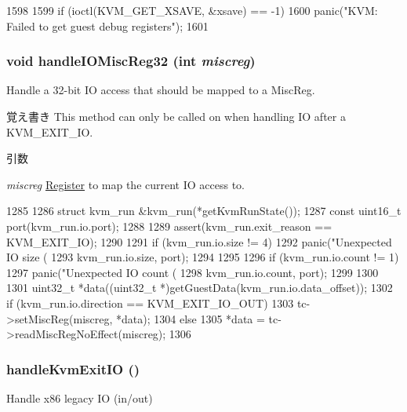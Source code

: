 \begin{DoxyCode}
1598 {
1599     if (ioctl(KVM_GET_XSAVE, &xsave) == -1)
1600         panic("KVM: Failed to get guest debug registers\n");
1601 }
\end{DoxyCode}
\hypertarget{classX86KvmCPU_a58452f4681b53990ff7470d1884ac13c}{
\subsubsection[{handleIOMiscReg32}]{\setlength{\rightskip}{0pt plus 5cm}void handleIOMiscReg32 (int {\em miscreg})}}
\label{classX86KvmCPU_a58452f4681b53990ff7470d1884ac13c}
Handle a 32-\/bit IO access that should be mapped to a MiscReg.

\begin{DoxyNote}{覚え書き}
This method can only be called on when handling IO after a KVM\_\-EXIT\_\-IO.
\end{DoxyNote}

\begin{DoxyParams}{引数}
\item[{\em miscreg}]\hyperlink{classRegister}{Register} to map the current IO access to. \end{DoxyParams}



\begin{DoxyCode}
1285 {
1286     struct kvm_run &kvm_run(*getKvmRunState());
1287     const uint16_t port(kvm_run.io.port);
1288 
1289     assert(kvm_run.exit_reason == KVM_EXIT_IO);
1290 
1291     if (kvm_run.io.size != 4) {
1292         panic("Unexpected IO size (%
1293               kvm_run.io.size, port);
1294     }
1295 
1296     if (kvm_run.io.count != 1) {
1297         panic("Unexpected IO count (%
1298               kvm_run.io.count, port);
1299     }
1300 
1301     uint32_t *data((uint32_t *)getGuestData(kvm_run.io.data_offset));
1302     if (kvm_run.io.direction == KVM_EXIT_IO_OUT)
1303         tc->setMiscReg(miscreg, *data);
1304     else
1305         *data = tc->readMiscRegNoEffect(miscreg);
1306 }
\end{DoxyCode}
\hypertarget{classX86KvmCPU_a404fbd80d6676724d026a932b2258dc7}{
\subsubsection[{handleKvmExitIO}]{ handleKvmExitIO ()}}
\label{classX86KvmCPU_a404fbd80d6676724d026a932b2258dc7}
Handle x86 legacy IO (in/out) 

